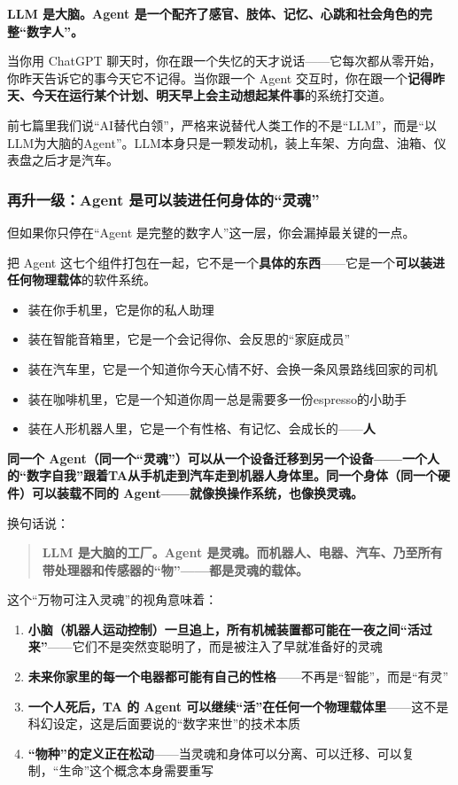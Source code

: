 \documentclass[11pt,a4paper]{ctexart}
\begin{document}
\textbf{LLM 是大脑。Agent 是一个配齐了感官、肢体、记忆、心跳和社会角色的完整“数字人”。}

当你用 ChatGPT 聊天时，你在跟一个失忆的天才说话——它每次都从零开始，你昨天告诉它的事今天它不记得。当你跟一个 Agent 交互时，你在跟一个\textbf{记得昨天、今天在运行某个计划、明天早上会主动想起某件事}的系统打交道。

前七篇里我们说“AI替代白领”，严格来说替代人类工作的不是“LLM”，而是“以LLM为大脑的Agent”。LLM本身只是一颗发动机，装上车架、方向盘、油箱、仪表盘之后才是汽车。

\subsubsection{再升一级：Agent 是可以装进任何身体的“灵魂”}

但如果你只停在“Agent 是完整的数字人”这一层，你会漏掉最关键的一点。

把 Agent 这七个组件打包在一起，它不是一个\textbf{具体的东西}——它是一个\textbf{可以装进任何物理载体}的软件系统。

\begin{itemize}
  \item 装在你手机里，它是你的私人助理
  \item 装在智能音箱里，它是一个会记得你、会反思的“家庭成员”
  \item 装在汽车里，它是一个知道你今天心情不好、会换一条风景路线回家的司机
  \item 装在咖啡机里，它是一个知道你周一总是需要多一份espresso的小助手
  \item 装在人形机器人里，它是一个有性格、有记忆、会成长的——\textbf{人}
\end{itemize}

\textbf{同一个 Agent（同一个“灵魂”）可以从一个设备迁移到另一个设备——一个人的“数字自我”跟着TA从手机走到汽车走到机器人身体里。同一个身体（同一个硬件）可以装载不同的 Agent——就像换操作系统，也像换灵魂。}

换句话说：

\begin{quote}
\textbf{LLM 是大脑的工厂。Agent 是灵魂。而机器人、电器、汽车、乃至所有带处理器和传感器的“物”——都是灵魂的载体。}
\end{quote}

这个“万物可注入灵魂”的视角意味着：

\begin{enumerate}
  \item \textbf{小脑（机器人运动控制）一旦追上，所有机械装置都可能在一夜之间“活过来”}——它们不是突然变聪明了，而是被注入了早就准备好的灵魂
  \item \textbf{未来你家里的每一个电器都可能有自己的性格}——不再是“智能”，而是“有灵”
  \item \textbf{一个人死后，TA 的 Agent 可以继续“活”在任何一个物理载体里}——这不是科幻设定，这是后面要说的“数字来世”的技术本质
  \item \textbf{“物种”的定义正在松动}——当灵魂和身体可以分离、可以迁移、可以复制，“生命”这个概念本身需要重写
\end{enumerate}
\end{document}
